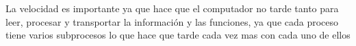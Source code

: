 \documentclass{article}
\begin{document}
	La velocidad es importante ya que hace que el computador no tarde tanto para leer, procesar y transportar la información y las funciones, ya que cada proceso tiene varios subprocesos lo que hace que tarde cada vez mas con cada uno de ellos
	\vfill
	\newpage
	
	
	
	
	
	
\end{document}
